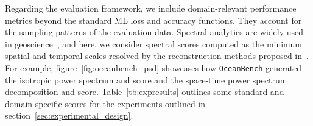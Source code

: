 



Regarding the evaluation framework, we include domain-relevant performance metrics beyond the standard ML loss and accuracy functions. They account for the sampling patterns of the evaluation data. Spectral analytics are widely used in geoscience~\cite{BFNQG}, and here, we consider spectral scores computed as the minimum spatial and temporal scales resolved by the reconstruction methods proposed in~\cite{BFNQG}.
For example, figure~\ref{fig:oceanbench_psd} showcases how \texttt{OceanBench} generated the isotropic power spectrum and score and the space-time power spectrum decomposition and score.
Table~\ref{tb:expresults} outlines some standard and domain-specific scores for the experiments outlined in section~\ref{sec:experimental_design}.


